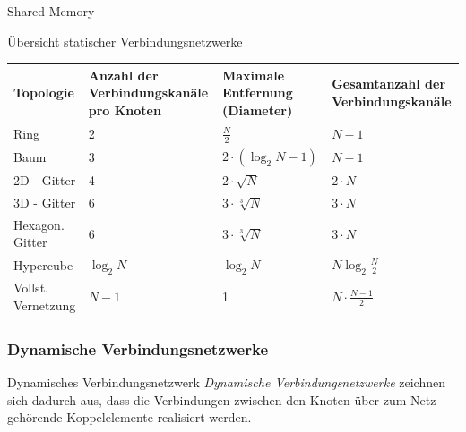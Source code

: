 \begin{defi}{Shared Memory}
    \begin{bonus}{Übersicht statischer Verbindungsnetzwerke}
        \begin{tabularx}{\textwidth}{|l|X|X|X|}
            \toprule
            Topologie          & Anzahl der Verbindungskanäle pro Knoten & Maximale Entfernung (Diameter) & Gesamtanzahl der Verbindungskanäle \\
            \midrule
            Ring               & 2                                       & $\frac{N}{2}$                  & $N-1$                              \\
            \midrule
            Baum               & 3                                       & $2\cdot (\log_2 N - 1)$        & $N-1$                              \\
            \midrule
            2D - Gitter        & 4                                       & $2\cdot \sqrt{N}$              & $2\cdot N$                         \\
            \midrule
            3D - Gitter        & 6                                       & $3\cdot \sqrt[3]{N}$           & $3\cdot N$                         \\
            \midrule
            Hexagon. Gitter    & 6                                       & $3\cdot \sqrt[3]{N}$           & $3\cdot N$                         \\
            \midrule
            Hypercube          & $\log_2 N$                              & $\log_2 N$                     & $N \log_2 \frac{N}{2}$             \\
            \midrule
            Vollst. Vernetzung & $N - 1$                                 & 1                              & $N \cdot \frac{N-1}{2}$            \\
            \bottomrule
        \end{tabularx}
    \end{bonus}

    \subsubsection{Dynamische Verbindungsnetzwerke}

    \begin{defi}{Dynamisches Verbindungsnetzwerk}
        \emph{Dynamische Verbindungsnetzwerke} zeichnen sich dadurch aus, dass die Verbindungen zwischen den Knoten über zum Netz gehörende Koppelelemente realisiert werden.


\end{defi}
\end{defi}
